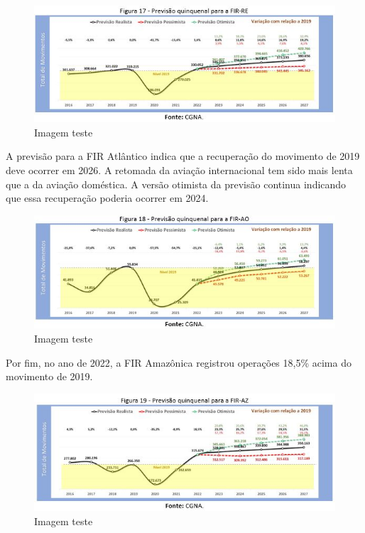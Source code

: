 \documentclass[
]{book}
\begin{document}
\begin{figure}
\centering
\includegraphics{imagens/fig20.jpg}
\caption{Imagem teste}
\end{figure}

A previsão para a FIR Atlântico indica que a recuperação do movimento de 2019 deve ocorrer em 2026. A retomada da aviação internacional tem sido mais lenta que a da aviação doméstica. A versão otimista da previsão continua indicando que essa recuperação poderia ocorrer em 2024.

\begin{figure}
\centering
\includegraphics{imagens/fig21.jpg}
\caption{Imagem teste}
\end{figure}

Por fim, no ano de 2022, a FIR Amazônica registrou operações 18,5\% acima do movimento de 2019.

\begin{figure}
\centering
\includegraphics{imagens/fig22.jpg}
\caption{Imagem teste}
\end{figure}
\end{document}
